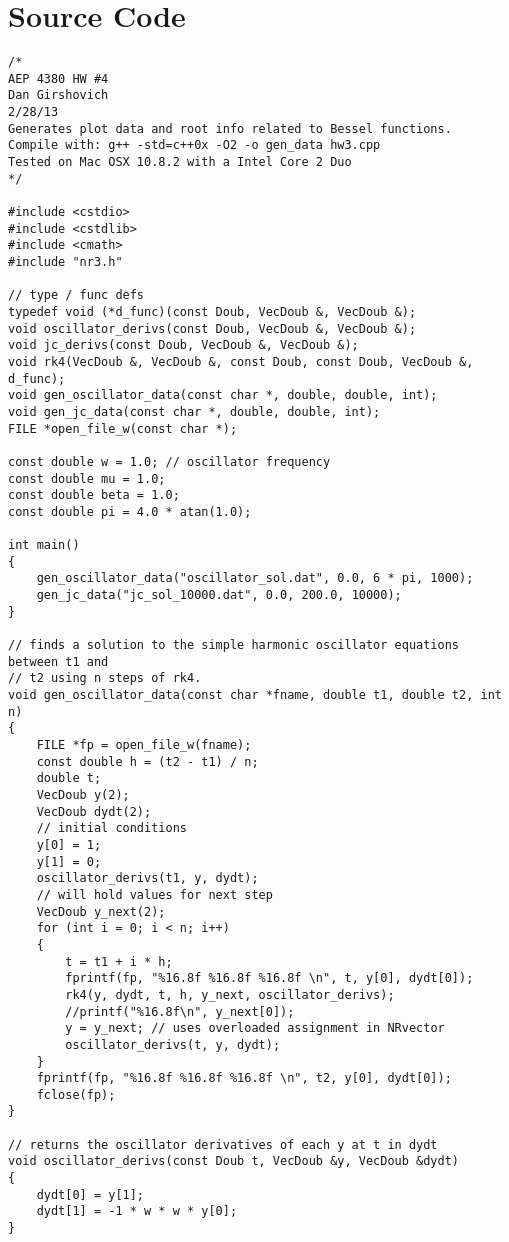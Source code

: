\documentclass[12pt]{article}
\begin{document}
\section{Source Code}
\begin{lstlisting}
/*
AEP 4380 HW #4
Dan Girshovich
2/28/13
Generates plot data and root info related to Bessel functions.
Compile with: g++ -std=c++0x -O2 -o gen_data hw3.cpp
Tested on Mac OSX 10.8.2 with a Intel Core 2 Duo
*/

#include <cstdio>
#include <cstdlib>
#include <cmath>
#include "nr3.h"

// type / func defs
typedef void (*d_func)(const Doub, VecDoub &, VecDoub &);
void oscillator_derivs(const Doub, VecDoub &, VecDoub &);
void jc_derivs(const Doub, VecDoub &, VecDoub &);
void rk4(VecDoub &, VecDoub &, const Doub, const Doub, VecDoub &, d_func);
void gen_oscillator_data(const char *, double, double, int);
void gen_jc_data(const char *, double, double, int);
FILE *open_file_w(const char *);

const double w = 1.0; // oscillator frequency
const double mu = 1.0;
const double beta = 1.0;
const double pi = 4.0 * atan(1.0);

int main()
{
    gen_oscillator_data("oscillator_sol.dat", 0.0, 6 * pi, 1000);
    gen_jc_data("jc_sol_10000.dat", 0.0, 200.0, 10000);
}

// finds a solution to the simple harmonic oscillator equations between t1 and
// t2 using n steps of rk4.
void gen_oscillator_data(const char *fname, double t1, double t2, int n)
{
    FILE *fp = open_file_w(fname);
    const double h = (t2 - t1) / n;
    double t;
    VecDoub y(2);
    VecDoub dydt(2);
    // initial conditions
    y[0] = 1;
    y[1] = 0;
    oscillator_derivs(t1, y, dydt);
    // will hold values for next step
    VecDoub y_next(2);
    for (int i = 0; i < n; i++)
    {
        t = t1 + i * h;
        fprintf(fp, "%16.8f %16.8f %16.8f \n", t, y[0], dydt[0]);
        rk4(y, dydt, t, h, y_next, oscillator_derivs);
        //printf("%16.8f\n", y_next[0]);
        y = y_next; // uses overloaded assignment in NRvector
        oscillator_derivs(t, y, dydt);
    }
    fprintf(fp, "%16.8f %16.8f %16.8f \n", t2, y[0], dydt[0]);
    fclose(fp);
}

// returns the oscillator derivatives of each y at t in dydt
void oscillator_derivs(const Doub t, VecDoub &y, VecDoub &dydt)
{
    dydt[0] = y[1];
    dydt[1] = -1 * w * w * y[0];
}


\end{lstlisting}
\end{document}
